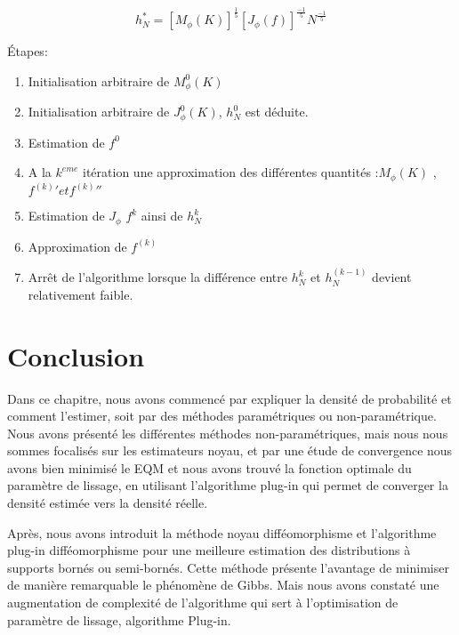 \begin{equation}
h^*_N = [M_\phi (K)]^\frac{1}{5} [J_\phi (f)]^\frac{-1}{5} N^\frac{-1}{5}
\end{equation}

Étapes:
\begin{enumerate}
    \item Initialisation arbitraire de $M_\phi^0 (K)$
    \item Initialisation arbitraire de $J_\phi^0 (K)$,  $h_N^0$ est déduite.
    \item Estimation de $f^0$ 
    \item A la $k^{eme}$ itération une approximation des différentes quantités :$ M_\phi (K)$ , ${f^{(k)}}' et {f^{(k)}}''$
    \item Estimation de $J_\phi$ $f^k$ ainsi de $h_N^k$
	\item Approximation de $f^{(k)}$  
	\item Arrêt de l’algorithme lorsque la différence entre $h_N^k$ et $h_N^{(k-1)}$ devient relativement faible.

\end{enumerate}
\newpage

\section{Conclusion}
	 Dans ce chapitre, nous avons commencé par expliquer la densité de probabilité et comment l’estimer, soit par des méthodes paramétriques ou non-paramétrique. Nous avons présenté les différentes méthodes non-paramétriques, mais nous nous sommes focalisés sur les estimateurs noyau, et par une étude de convergence nous avons bien minimisé le EQM et nous avons trouvé la fonction optimale du paramètre de lissage, en utilisant l’algorithme plug-in qui permet de converger la densité estimée vers la densité réelle. 

Après, nous avons introduit la méthode noyau difféomorphisme et l’algorithme plug-in difféomorphisme pour une meilleure estimation des distributions à supports bornés ou semi-bornés. Cette méthode présente l’avantage de minimiser de manière remarquable le phénomène de Gibbs. Mais nous avons constaté une augmentation de complexité de l’algorithme qui sert à l’optimisation de paramètre de lissage, algorithme Plug-in.
